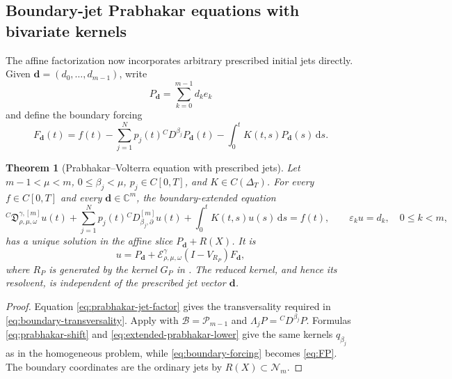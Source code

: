 \documentclass[11pt]{article}
\numberwithin{equation}{section}
\newtheorem{theorem}{Theorem}
\theoremstyle{definition}
\theoremstyle{remark}
\newcommand{\C}{\mathbb C}
\newcommand{\E}{\mathcal E}
\newcommand{\dd}{\,\mathrm d}
\begin{document}
\subsection{Boundary-jet Prabhakar equations with bivariate kernels}

The affine factorization now incorporates arbitrary prescribed initial jets directly. Given $\mathbf d=(d_0,\ldots,d_{m-1})$, write
\begin{equation*}
P_{\mathbf d}=\sum_{k=0}^{m-1}d_ke_k
\end{equation*}
and define the boundary forcing
\begin{equation}
F_{\mathbf d}(t)=f(t)
-\sum_{j=1}^{N}p_j(t){}^CD^{\beta_j}P_{\mathbf d}(t)
-\int_0^tK(t,s)P_{\mathbf d}(s)\dd s.
\label{eq:FP}
\end{equation}

\begin{theorem}[Prabhakar--Volterra equation with prescribed jets]\label{thm:prabhakar-jets}
Let $m-1<\mu<m$, $0\le\beta_j<\mu$, $p_j\in C[0,T]$, and $K\in C(\Delta_T)$. For every $f\in C[0,T]$ and every $\mathbf d\in\C^m$, the boundary-extended equation
\begin{equation}
{}^C\!\mathfrak D_{\rho,\mu,\omega}^{\gamma,[m]}u(t)
+\sum_{j=1}^{N}p_j(t){}^C\!D_{\beta_j,\partial}^{[m]}u(t)
+\int_0^tK(t,s)u(s)\dd s=f(t),
\qquad \varepsilon_ku=d_k,\quad 0\le k<m,
\label{eq:prabhakar-ivp}
\end{equation}
has a unique solution in the affine slice $P_{\mathbf d}+R(X)$. It is
\begin{equation}
u=P_{\mathbf d}
+\E_{\rho,\mu,\omega}^{\gamma}(I-V_{R_P})F_{\mathbf d},
\label{eq:prabhakar-solution}
\end{equation}
where $R_P$ is generated by the kernel $G_P$ in . The reduced kernel, and hence its resolvent, is independent of the prescribed jet vector $\mathbf d$.
\end{theorem}

\begin{proof}
Equation \eqref{eq:prabhakar-jet-factor} gives the transversality required in \eqref{eq:boundary-transversality}. Apply  with $\mathcal B=\mathcal P_{m-1}$ and $\Lambda_jP={}^CD^{\beta_j}P$. Formulas \eqref{eq:prabhakar-shift} and \eqref{eq:extended-prabhakar-lower} give the same kernels $q_{\beta_j}$ as in the homogeneous problem, while \eqref{eq:boundary-forcing} becomes \eqref{eq:FP}. The boundary coordinates are the ordinary jets by $R(X)\subset\mathcal N_m$.
\end{proof}
\end{document}
